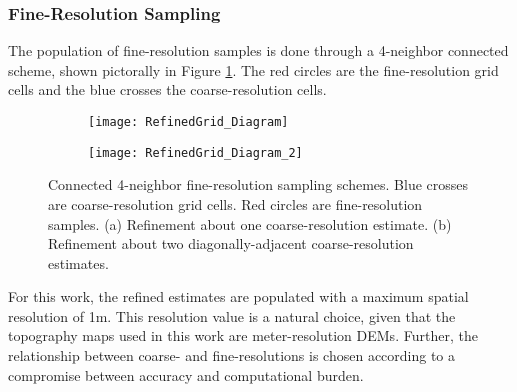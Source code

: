 \subsubsection{Fine-Resolution Sampling}
\label{framework.Motionless.Estimate.Sampling}

The population of fine-resolution samples is done through a 4-neighbor connected scheme, shown pictorally in Figure \ref{fig:refinegrid_diagram}.  
The red circles are the fine-resolution grid cells and the blue crosses the coarse-resolution cells.

\begin{figure}[!h]
	\centering
	\begin{subfigure}[b]{0.4\textwidth}
		\texttt{[image: RefinedGrid\_Diagram]}
		\caption{}
		\label{fig:refinegrid_diagram}
	\end{subfigure}
	\hspace{8ex}
	\centering
	\begin{subfigure}[b]{0.415\textwidth}
		\texttt{[image: RefinedGrid\_Diagram\_2]}
		\caption{}
		\label{fig:resolution}
	\end{subfigure}
	\caption{Connected 4-neighbor fine-resolution sampling schemes.  Blue crosses are coarse-resolution grid cells.  Red circles are fine-resolution samples. (a) Refinement about one coarse-resolution estimate. (b) Refinement about two diagonally-adjacent coarse-resolution estimates.  }	
\end{figure}

For this work, the refined estimates are populated with a maximum spatial resolution of 1m. 
This resolution value is a natural choice, given that the topography maps used in this work are meter-resolution DEMs.  
Further, the relationship between coarse- and fine-resolutions is chosen according to a compromise between accuracy and computational burden.  
%

